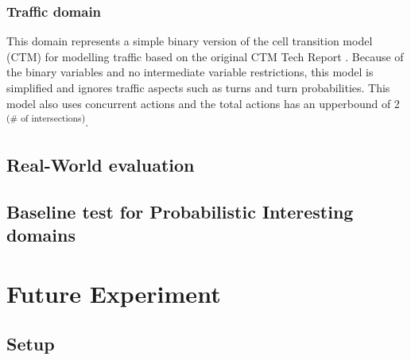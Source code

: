 \documentclass[runningheads,a4paper]{llncs}
\begin{document}

\subsubsection{Traffic domain}
This domain represents a simple binary version of the cell transition model (CTM) for modelling traffic based on the original CTM Tech Report \cite{sanner2011traffic}. Because of the binary variables and no intermediate variable restrictions, this model is simplified and ignores traffic aspects such as turns and turn probabilities. This model also uses concurrent actions and the total actions has an upperbound of 2\textsuperscript{ (\# of intersections)}.


%
%

\subsection{Real-World evaluation}

\subsection{Baseline test for Probabilistic Interesting domains}


\section{Future Experiment}

\subsection{Setup}
\end{document}
